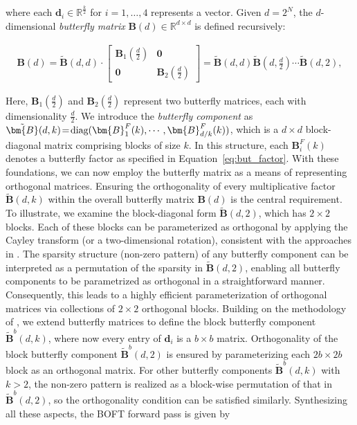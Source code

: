 where each $\bm{d}_i\in\mathbb{R}^{\frac{k}{2}}$ for $i=1,\ldots,4$ represents a vector. Given $d=2^N$, the $d$-dimensional \emph{butterfly matrix} $\bm{B}(d)\in\mathbb{R}^{d\times d}$ is defined recursively:

\begin{equation}
\begin{aligned}
    \!\!\bm{B}(d)=\tilde{\bm{B}}(d,d)\!\cdot\!\begin{bmatrix}
    \bm{B}_1(\frac{d}{2})\!\!\!\!\! & \bm{0} \\
    \bm{0}\!\!\!\!\! &\bm{B}_2(\frac{d}{2})
    \end{bmatrix}= \tilde{\bm{B}}(d,d)\tilde{\bm{B}}(d,\frac{d}{2})\cdots\tilde{\bm{B}}(d,2),
\end{aligned}
\end{equation}

Here, $\bm{B}_1(\frac{d}{2})$ and $\bm{B}_2(\frac{d}{2})$ represent two butterfly matrices, each with dimensionality $\frac{d}{2}$. We introduce the \emph{butterfly component} as $\thickmuskip=2mu \medmuskip=2mu \tilde{\bm{B}}(d,k)=\text{diag}(\bm{B}^F_1(k),\cdots,\bm{B}^F_{d/k}(k))$, which is a $d\times d$ block-diagonal matrix comprising blocks of size $k$. In this structure, each $\bm{B}^F_i(k)$ denotes a butterfly factor as specified in Equation~\ref{eq:but_factor}. With these foundations, we can now employ the butterfly matrix as a means of representing orthogonal matrices. Ensuring the orthogonality of every multiplicative factor $\tilde{\bm{B}}(d,k)$ within the overall butterfly matrix $\bm{B}(d)$ is the central requirement. To illustrate, we examine the block-diagonal form $\tilde{\bm{B}}(d,2)$, which has $2\times2$ blocks. Each of these blocks can be parameterized as orthogonal by applying the Cayley transform (or a two-dimensional rotation), consistent with the approaches in \cite{liu2021orthogonal,qiu2023controlling}. The sparsity structure (non-zero pattern) of any butterfly component can be interpreted as a permutation of the sparsity in $\tilde{\bm{B}}(d,2)$, enabling all butterfly components to be parametrized as orthogonal in a straightforward manner. Consequently, this leads to a highly efficient parameterization of orthogonal matrices via collections of $2\times 2$ orthogonal blocks. Building on the methodology of \cite{chen2022pixelated}, we extend butterfly matrices to define the block butterfly component $\tilde{\bm{B}}^b(d,k)$, where now every entry of $\bm{d}_i$ is a $b\times b$ matrix. Orthogonality of the block butterfly component $\tilde{\bm{B}}^b(d,2)$ is ensured by parameterizing each $2b\times 2b$ block as an orthogonal matrix. For other butterfly components $\tilde{\bm{B}}^b(d,k)$ with $k>2$, the non-zero pattern is realized as a block-wise permutation of that in $\tilde{\bm{B}}^b(d,2)$, so the orthogonality condition can be satisfied similarly. Synthesizing all these aspects, the BOFT forward pass is given by


